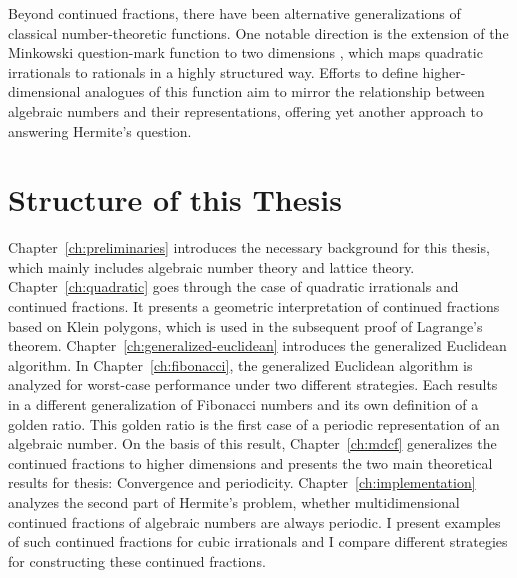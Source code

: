 Beyond continued fractions, there have been alternative
generalizations of classical number-theoretic functions.
One notable direction is the extension of the Minkowski question-mark function
to two dimensions \cite{Beaver04}, which maps quadratic irrationals to rationals in a highly structured way.
Efforts to define higher-dimensional analogues of this function aim to mirror
the relationship between algebraic numbers and their representations,
offering yet another approach to answering Hermite’s question.

\section{Structure of this Thesis}

Chapter~\ref{ch:preliminaries} introduces the necessary background for this thesis,
which mainly includes algebraic number theory and lattice theory.
Chapter~\ref{ch:quadratic} goes through the case of quadratic irrationals and continued fractions.
It presents a geometric interpretation of continued fractions based on Klein polygons,
which is used in the subsequent proof of Lagrange's theorem.
Chapter~\ref{ch:generalized-euclidean} introduces the generalized Euclidean algorithm.
In Chapter~\ref{ch:fibonacci}, the generalized Euclidean algorithm is analyzed
for worst-case performance under two different strategies.
Each results in a different generalization of Fibonacci numbers and its own definition of a golden ratio.
This golden ratio is the first case of a periodic representation of an algebraic number.
On the basis of this result, Chapter~\ref{ch:mdcf} generalizes the continued fractions to higher dimensions
and presents the two main theoretical results for thesis: Convergence and periodicity.
Chapter~\ref{ch:implementation} analyzes the second part of Hermite's problem,
whether multidimensional continued fractions of algebraic numbers are always periodic.
I present examples of such continued fractions for cubic irrationals and I
compare different strategies for constructing these continued fractions.
